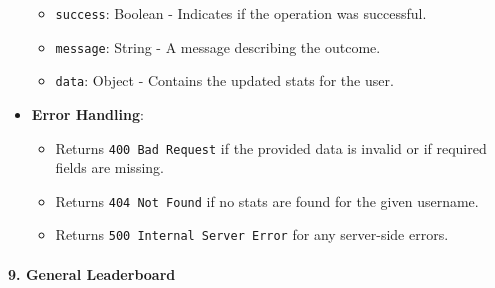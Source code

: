 \begin{itemize}
  \begin{itemize}
  \tightlist
  \item
    \texttt{success}: Boolean - Indicates if the operation was
    successful.
  \item
    \texttt{message}: String - A message describing the outcome.
  \item
    \texttt{data}: Object - Contains the updated stats for the user.
  \end{itemize}
\item
  \textbf{Error Handling}:

  \begin{itemize}
  \tightlist
  \item
    Returns \texttt{400\ Bad\ Request} if the provided data is invalid
    or if required fields are missing.
  \item
    Returns \texttt{404\ Not\ Found} if no stats are found for the given
    username.
  \item
    Returns \texttt{500\ Internal\ Server\ Error} for any server-side
    errors.
  \end{itemize}
\end{itemize}

\hypertarget{general-leaderboard}{%
\paragraph{9. General Leaderboard}\label{general-leaderboard}}

